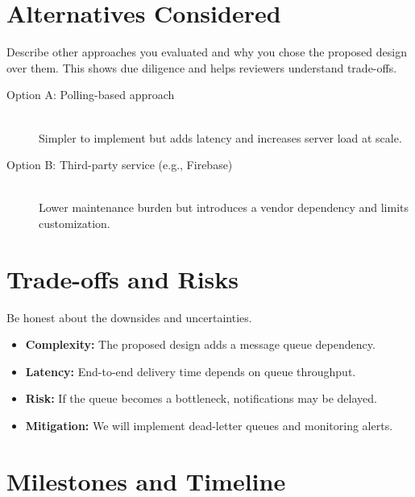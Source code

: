 \documentclass[11pt, a4paper]{article}
\begin{document}
\section{Alternatives Considered}

Describe other approaches you evaluated and why you chose the proposed design over them. This shows due diligence and helps reviewers understand trade-offs.

\begin{description}
    \item[Option A: Polling-based approach] \hfill \\
        Simpler to implement but adds latency and increases server load at scale.
    \item[Option B: Third-party service (e.g., Firebase)] \hfill \\
        Lower maintenance burden but introduces a vendor dependency and limits customization.
\end{description}

\section{Trade-offs and Risks}

Be honest about the downsides and uncertainties.

\begin{itemize}
    \item \textbf{Complexity:} The proposed design adds a message queue dependency.
    \item \textbf{Latency:} End-to-end delivery time depends on queue throughput.
    \item \textbf{Risk:} If the queue becomes a bottleneck, notifications may be delayed.
    \item \textbf{Mitigation:} We will implement dead-letter queues and monitoring alerts.
\end{itemize}

\section{Milestones and Timeline}
\end{document}
